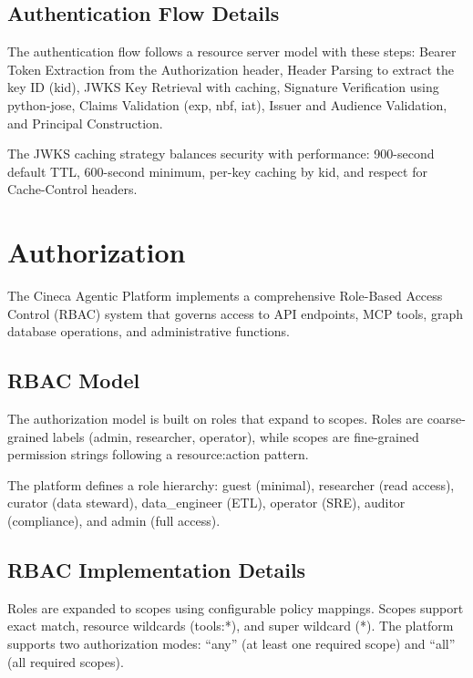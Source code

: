 \documentclass[a4paper,twoside]{sapthesis}
\begin{document}
\subsection{Authentication Flow Details}
\label{subsec:auth-flow-details}

The authentication flow follows a resource server model with these steps: Bearer Token Extraction from the Authorization header, Header Parsing to extract the key ID (kid), JWKS Key Retrieval with caching, Signature Verification using python-jose, Claims Validation (exp, nbf, iat), Issuer and Audience Validation, and Principal Construction.

The JWKS caching strategy balances security with performance: 900-second default TTL, 600-second minimum, per-key caching by kid, and respect for Cache-Control headers.

\section{Authorization}
\label{sec:authorization}

The Cineca Agentic Platform implements a comprehensive Role-Based Access Control (RBAC) system that governs access to API endpoints, MCP tools, graph database operations, and administrative functions.

\subsection{RBAC Model}
\label{subsec:rbac-model}

The authorization model is built on roles that expand to scopes. Roles are coarse-grained labels (admin, researcher, operator), while scopes are fine-grained permission strings following a resource:action pattern.

The platform defines a role hierarchy: guest (minimal), researcher (read access), curator (data steward), data\_engineer (ETL), operator (SRE), auditor (compliance), and admin (full access).

\subsection{RBAC Implementation Details}
\label{subsec:rbac-implementation}

Roles are expanded to scopes using configurable policy mappings. Scopes support exact match, resource wildcards (tools:*), and super wildcard (*). The platform supports two authorization modes: ``any'' (at least one required scope) and ``all'' (all required scopes).
\end{document}
